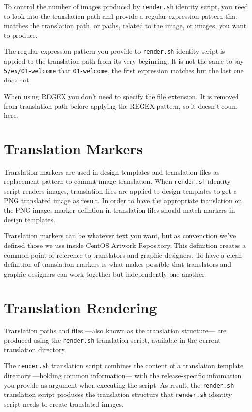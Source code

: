 To control the number of images produced by \texttt{render.sh}
identity script, you need to look into the translation path and
provide a regular expression pattern that matches the translation
path, or paths, related to the image, or images, you want to produce.  

The regular expression pattern you provide to \texttt{render.sh}
identity script is applied to the translation path from its very
beginning.  It is not the same to say \texttt{5/es/01-welcome} that
\texttt{01-welcome}, the frist expression matches but the last one
does not.

When using REGEX you don't need to specify the file extension. It is
removed from translation path before applying the REGEX pattern, so it
doesn't count here.

\section{Translation Markers}
\hypertarget{sec:Concepts:Translations:Markers}{}

Translation markers are used in design templates and translation files
as replacement pattern to commit image translation.  When
\texttt{render.sh} identity script renders images, translation files
are applied to design templates to get a PNG translated image as
result.  In order to have the appropriate translation on the PNG
image, marker defintion in translation files should match markers in
design templates. 

Translation markers can be whatever text you want, but as convenction
we've defined those we use inside CentOS Artwork Repository. This
definition creates a common point of reference to translators and
graphic designers. To have a clean definition of translation markers
is what makes possible that translators and graphic designers can work
together but independently one another.

\section{Translation Rendering}
\hypertarget{sec:Concepts:Translations:Rendering}{}

Translation paths and files ---also known as the translation
structure--- are produced using the \texttt{render.sh} translation
script, available in the current translation directory.

The \texttt{render.sh} translation script combines the content of a
translation template directory ---holding common information--- with
the release-specific information you provide as argument when
executing the script. As result,  the \texttt{render.sh} translation
script produces the translation structure that \texttt{render.sh}
identity script needs to create translated images.

